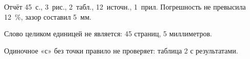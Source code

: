 Отчёт 45~с., 3~рис., 2~табл., 12~источн., 1~прил.
Погрешность не превысила 12~\%, зазор составил 5~мм.

Слово целиком единицей не является: 45 страниц, 5 миллиметров.

Одиночное «с» без точки правило не проверяет: таблица 2 с результатами.
